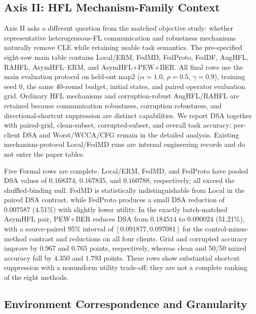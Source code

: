 \subsection{Axis II: HFL Mechanism-Family Context}

Axis II asks a different question from the matched objective study: whether representative heterogeneous-FL communication and robustness mechanisms naturally remove CLE while retaining usable task semantics. The pre-specified eight-row main table contains Local/ERM, FedMD, FedProto, FedDF, AugHFL, RAHFL, AsymHFL--ERM, and AsymHFL+PEW+BER. All final rows use the main evaluation protocol on held-out map2 ($\alpha=1.0$, $\rho=0.5$, $\gamma=0.9$), training seed 0, the same 40-round budget, initial states, and paired operator evaluation grid. Ordinary HFL mechanisms and corruption-robust AugHFL/RAHFL are retained because communication robustness, corruption robustness, and directional-shortcut suppression are distinct capabilities. We report DSA together with paired-grid, clean-subset, corrupted-subset, and overall task accuracy; per-client DSA and Worst/WCCA/CFG remain in the detailed analysis. Existing mechanism-protocol Local/FedMD runs are internal engineering records and do not enter the paper tables.



Five Formal rows are complete. Local/ERM, FedMD, and FedProto have pooled DSA values of \(0.168374\), \(0.167835\), and \(0.160788\), respectively; all exceed the shuffled-binding null. FedMD is statistically indistinguishable from Local in the paired DSA contrast, while FedProto produces a small DSA reduction of \(0.007587\) (4.51\%) with slightly lower utility. In the exactly batch-matched AsymHFL pair, PEW+BER reduces DSA from \(0.184514\) to \(0.090024\) (51.21\%), with a source-paired 95\% interval of \([0.091877,0.097081]\) for the control-minus-method contrast and reductions on all four clients. Grid and corrupted accuracy improve by \(0.967\) and \(0.765\) points, respectively, whereas clean and 50/50 mixed accuracy fall by \(4.350\) and \(1.793\) points. These rows show substantial shortcut suppression with a nonuniform utility trade-off; they are not a complete ranking of the eight methods.


\subsection{Environment Correspondence and Granularity}

